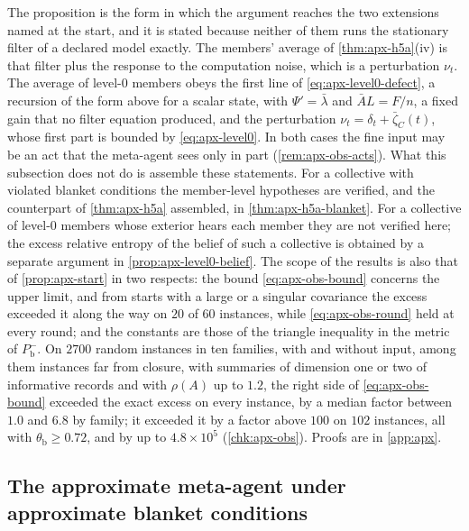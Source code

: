 The proposition is the form in which the argument reaches the two extensions named at the start, and it is stated because neither of them runs the stationary filter of a declared model exactly. The members' average of \cref{thm:apx-h5a}(iv) is that filter plus the response to the computation noise, which is a perturbation $\nu_t$. The average of level-0 members obeys the first line of \eqref{eq:apx-level0-defect}, a recursion of the form above for a scalar state, with $\Psi'=\bar\lambda$ and $\bar AL=F/n$, a fixed gain that no filter equation produced, and the perturbation $\nu_t=\delta_t+\bar\zeta_C(t)$, whose first part is bounded by \eqref{eq:apx-level0}. In both cases the fine input may be an act that the meta-agent sees only in part (\cref{rem:apx-obs-acts}). What this subsection does not do is assemble these statements. For a collective with violated blanket conditions the member-level hypotheses are verified, and the counterpart of \cref{thm:apx-h5a} assembled, in \cref{thm:apx-h5a-blanket}. For a collective of level-0 members whose exterior hears each member they are not verified here; the excess relative entropy of the belief of such a collective is obtained by a separate argument in \cref{prop:apx-level0-belief}. The scope of the results is also that of \cref{prop:apx-start} in two respects: the bound \eqref{eq:apx-obs-bound} concerns the upper limit, and from starts with a large or a singular covariance the excess exceeded it along the way on $20$ of $60$ instances, while \eqref{eq:apx-obs-round} held at every round; and the constants are those of the triangle inequality in the metric of $P^-_{\mathrm b}$. On $2700$ random instances in ten families, with and without input, among them instances far from closure, with summaries of dimension one or two of informative records and with $\rho(A)$ up to $1.2$, the right side of \eqref{eq:apx-obs-bound} exceeded the exact excess on every instance, by a median factor between $1.0$ and $6.8$ by family; it exceeded it by a factor above $100$ on $102$ instances, all with $\theta_{\mathrm b}\ge0.72$, and by up to $4.8\times10^5$ (\cref{chk:apx-obs}). Proofs are in \cref{app:apx}.

\subsection{The approximate meta-agent under approximate blanket conditions}\label{sec:apx-h5a-blanket}

